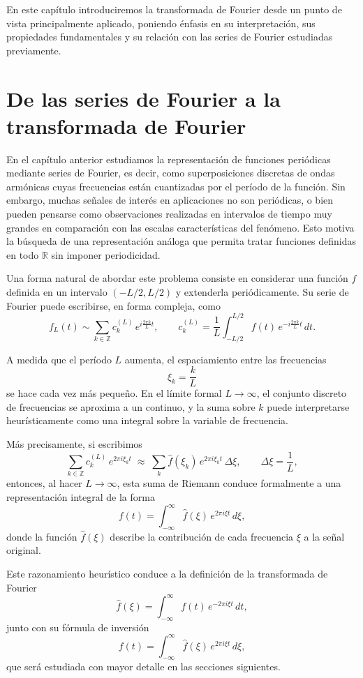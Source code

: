 \documentclass[12pt, a4paper]{amsbook}
\newcommand{\R}{{\mathbb R}}
\newcommand{\Z}{{\mathbb Z}}
\theoremstyle{remark}
\theoremstyle{definition}
\numberwithin{section}{chapter}
\numberwithin{subsection}{section}
\numberwithin{equation}{section}
\numberwithin{figure}{chapter}
\begin{document}
En este capítulo introduciremos la transformada de Fourier desde un punto de vista principalmente aplicado, poniendo énfasis en su interpretación, sus propiedades fundamentales y su relación con las series de Fourier estudiadas previamente. 

\section{De las series de Fourier a la transformada de Fourier}

En el capítulo anterior estudiamos la representación de funciones periódicas mediante series de Fourier, es decir, como superposiciones discretas de ondas armónicas cuyas frecuencias están cuantizadas por el período de la función. Sin embargo, muchas señales de interés en aplicaciones no son periódicas, o bien pueden pensarse como observaciones realizadas en intervalos de tiempo muy grandes en comparación con las escalas características del fenómeno. Esto motiva la búsqueda de una representación análoga que permita tratar funciones definidas en todo $\R$ sin imponer periodicidad.

Una forma natural de abordar este problema consiste en considerar una función $f$ definida en un intervalo $(-L/2,L/2)$ y extenderla periódicamente. Su serie de Fourier puede escribirse, en forma compleja, como
$$
f_L(t) \sim \sum_{k\in\Z} c_k^{(L)}\, e^{i \frac{2\pi k}{L} t}, \qquad c_k^{(L)} = \frac{1}{L} \int_{-L/2}^{L/2} f(t)\, e^{-i \frac{2\pi k}{L} t}\, dt.
$$

A medida que el período $L$ aumenta, el espaciamiento entre las frecuencias
$$
\xi_k = \frac{k}{L}
$$
se hace cada vez más pequeño. En el límite formal $L\to\infty$, el conjunto discreto de frecuencias se aproxima a un continuo, y la suma sobre $k$ puede interpretarse heurísticamente como una integral sobre la variable de frecuencia.

Más precisamente, si escribimos
$$
\sum_{k\in\Z} c_k^{(L)}\, e^{2\pi i \xi_k t} \;\approx\; \sum_k \hat f(\xi_k)\, e^{2\pi i \xi_k t}\,\Delta \xi, \qquad \Delta \xi = \frac{1}{L},
$$
entonces, al hacer $L\to\infty$, esta suma de Riemann conduce formalmente a una representación integral de la forma
$$
f(t) = \int_{-\infty}^{\infty} \hat f(\xi)\, e^{2\pi i \xi t}\, d\xi,
$$
donde la función $\hat f(\xi)$ describe la contribución de cada frecuencia $\xi$ a la señal original.

Este razonamiento heurístico conduce a la definición de la transformada de Fourier
\begin{equation}\label{fourier.trans}
\hat f(\xi) = \int_{-\infty}^{\infty} f(t)\, e^{-2\pi i\xi t}\, dt,
\end{equation}
junto con su fórmula de inversión
\begin{equation}\label{fourier.inverse}
f(t) = \int_{-\infty}^{\infty} \hat f(\xi)\, e^{2\pi i\xi t}\, d\xi,
\end{equation}
que será estudiada con mayor detalle en las secciones siguientes.
\end{document}
